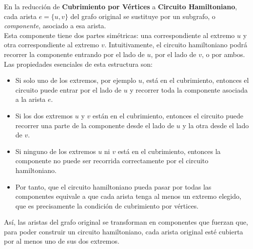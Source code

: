 \documentclass[12pt]{article}
\begin{document}
\begin{ejercicio}[1.3 puntos]
\begin{enumerate}
            En la reducción de \textbf{Cubrimiento por Vértices} a \textbf{Circuito Hamiltoniano}, cada arista $e=\{u,v\}$ del grafo 
            original se sustituye por un subgrafo, o \textit{componente}, asociado a esa arista. \\

            Esta componente tiene dos partes simétricas: una correspondiente al extremo $u$ y otra correspondiente al extremo $v$. 
            Intuitivamente, el circuito hamiltoniano podrá recorrer la componente entrando por el lado de $u$, por el lado de $v$, o 
            por ambos. \\

            Las propiedades esenciales de esta estructura son:

            \begin{itemize}
                \item Si solo uno de los extremos, por ejemplo $u$, está en el cubrimiento, entonces el circuito puede entrar por el lado de $u$ y recorrer toda la componente asociada a la arista $e$.

                \item Si los dos extremos $u$ y $v$ están en el cubrimiento, entonces el circuito puede recorrer una parte de la componente desde el lado de $u$ y la otra desde el lado de $v$.

                \item Si ninguno de los extremos $u$ ni $v$ está en el cubrimiento, entonces la componente no puede ser recorrida correctamente por el circuito hamiltoniano.

                \item Por tanto, que el circuito hamiltoniano pueda pasar por todas las componentes equivale a que cada arista tenga al menos un extremo elegido, que es precisamente la condición de cubrimiento por vértices.
            \end{itemize}

            Así, las aristas del grafo original se transforman en componentes que fuerzan que, para poder construir un circuito hamiltoniano, cada arista original esté cubierta por al menos uno de sus dos extremos.
        \end{enumerate}
    \end{ejercicio}

    \newpage
\end{document}
